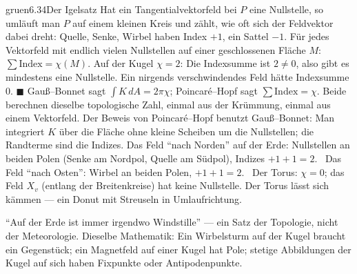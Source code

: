 \begin{loesungkarte}{gruen}{6.34}{Der Igelsatz}
Hat ein Tangentialvektorfeld bei $P$ eine Nullstelle, so umläuft man $P$ auf einem kleinen Kreis und zählt, wie oft sich der Feldvektor dabei dreht: Quelle, Senke, Wirbel haben Index $+1$, ein Sattel $-1$.
Für jedes Vektorfeld mit endlich vielen Nullstellen auf einer geschlossenen Fläche $M$: $\sum\text{Index} = \chi(M)$. Auf der Kugel $\chi = 2$: Die Indexsumme ist $2\neq0$, also gibt es mindestens eine Nullstelle. Ein nirgends verschwindendes Feld hätte Indexsumme $0$. $\blacksquare$
Gauß--Bonnet sagt $\int K\,dA = 2\pi\chi$; Poincaré--Hopf sagt $\sum\text{Index} = \chi$. Beide berechnen dieselbe topologische Zahl, einmal aus der Krümmung, einmal aus einem Vektorfeld. Der Beweis von Poincaré--Hopf benutzt Gauß--Bonnet: Man integriert $K$ über die Fläche ohne kleine Scheiben um die Nullstellen; die Randterme sind die Indizes.
Das Feld \enquote{nach Norden} auf der Erde: Nullstellen an beiden Polen (Senke am Nordpol, Quelle am Südpol), Indizes $+1 + 1 = 2$. \checkmark\ Das Feld \enquote{nach Osten}: Wirbel an beiden Polen, $+1 + 1 = 2$. \checkmark\ Der Torus: $\chi = 0$; das Feld $X_v$ (entlang der Breitenkreise) hat keine Nullstelle. Der Torus lässt sich kämmen --- ein Donut mit Streuseln in Umlaufrichtung.
\begin{mitnehmen}\kastentext
\enquote{Auf der Erde ist immer irgendwo Windstille} --- ein Satz der Topologie, nicht der Meteorologie. Dieselbe Mathematik: Ein Wirbelsturm auf der Kugel braucht ein Gegenstück; ein Magnetfeld auf einer Kugel hat Pole; stetige Abbildungen der Kugel auf sich haben Fixpunkte oder Antipodenpunkte.
\end{mitnehmen}
\end{loesungkarte}

